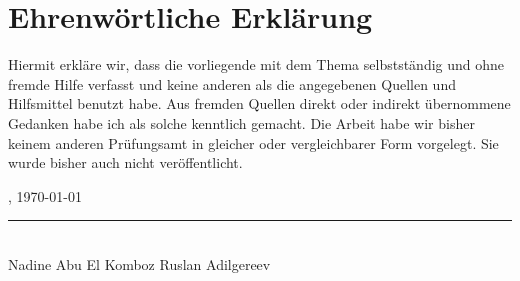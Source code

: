\section*{Ehrenwörtliche Erklärung}

Hiermit erkläre wir, dass die vorliegende  \art\/ mit dem Thema \newline \newline
{\itshape{} \titel\/}\newline \newline
 selbstständig und ohne fremde Hilfe verfasst
und keine anderen als die angegebenen Quellen und Hilfsmittel benutzt habe. Aus fremden Quellen direkt oder
indirekt übernommene Gedanken habe ich als solche kenntlich gemacht. Die Arbeit habe wir bisher keinem
anderen Prüfungsamt in gleicher oder vergleichbarer Form vorgelegt. Sie wurde bisher auch nicht veröffentlicht.


\vspace{3em}

\abgabeort, \today
\vspace{4em}

\rule{16cm}{0.4pt}\\
Nadine Abu El Komboz \hfill Ruslan Adilgereev \hfill\autor
 
